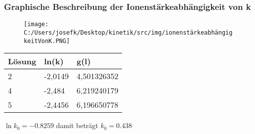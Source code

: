 \subsubsection{Graphische Beschreibung der Ionenstärkeabhängigkeit von k}

\begin{figure}[H]
	\texttt{[image: C:/Users/josefk/Desktop/kinetik/src/img/ionenstärkeabhängigkeitVonK.PNG]}
\end{figure}


\begin{table}[H]
	\centering
    \begin{tabular}{lll}
        \toprule
        Lösung & ln(k)   & g(l)        \\
        \midrule
		2      & -2,0149 & 4,501326352 \\
		4      & -2,484  & 6,219240179 \\
        5      & -2,4456 & 6,196650778 \\
        \bottomrule
	\end{tabular}
\end{table}
$\ln{k_0} = -0.8259$ damit beträgt $k_0 = 0.438$